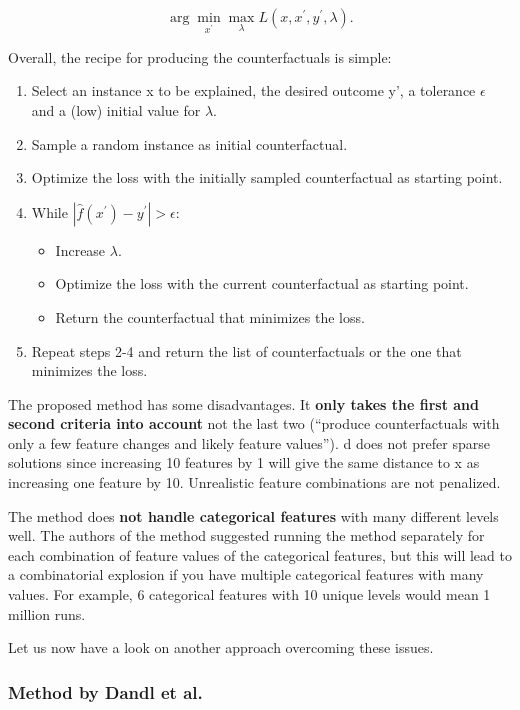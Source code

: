 \documentclass[
  12pt,
]{krantz}
\providecommand{\tightlist}{%
  \setlength{\itemsep}{0pt}\setlength{\parskip}{0pt}}
\begin{document}
\[\arg\min_{x^\prime}\max_{\lambda}L(x,x^\prime,y^\prime,\lambda).\]

Overall, the recipe for producing the counterfactuals is simple:

\begin{enumerate}
\def\labelenumi{\arabic{enumi}.}
\tightlist
\item
  Select an instance x to be explained, the desired outcome y', a tolerance \(\epsilon\) and a (low) initial value for \(\lambda\).
\item
  Sample a random instance as initial counterfactual.
\item
  Optimize the loss with the initially sampled counterfactual as starting point.
\item
  While \(|\hat{f}(x^\prime)-y^\prime|>\epsilon\):

  \begin{itemize}
  \tightlist
  \item
    Increase \(\lambda\).
  \item
    Optimize the loss with the current counterfactual as starting point.
  \item
    Return the counterfactual that minimizes the loss.
  \end{itemize}
\item
  Repeat steps 2-4 and return the list of counterfactuals or the one that minimizes the loss.
\end{enumerate}

The proposed method has some disadvantages.
It \textbf{only takes the first and second criteria into account} not the last two (``produce counterfactuals with only a few feature changes and likely feature values'').
d does not prefer sparse solutions since increasing 10 features by 1 will give the same distance to x as increasing one feature by 10.
Unrealistic feature combinations are not penalized.

The method does \textbf{not handle categorical features} with many different levels well.
The authors of the method suggested running the method separately for each combination of feature values of the categorical features, but this will lead to a combinatorial explosion if you have multiple categorical features with many values.
For example, 6 categorical features with 10 unique levels would mean 1 million runs.

Let us now have a look on another approach overcoming these issues.

\hypertarget{method-by-dandl-et-al.}{%
\subsubsection{Method by Dandl et al.~}\label{method-by-dandl-et-al.}}
\end{document}
